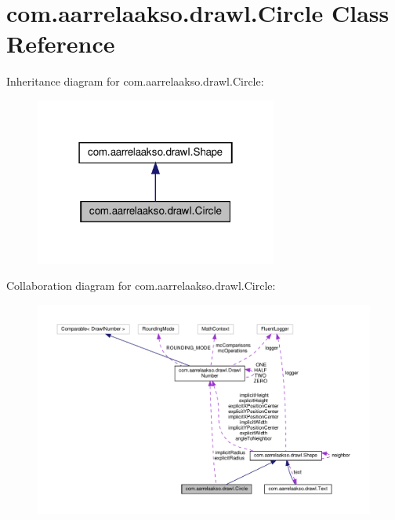 \hypertarget{classcom_1_1aarrelaakso_1_1drawl_1_1_circle}{}\section{com.\+aarrelaakso.\+drawl.\+Circle Class Reference}
\label{classcom_1_1aarrelaakso_1_1drawl_1_1_circle}


Inheritance diagram for com.\+aarrelaakso.\+drawl.\+Circle\+:\nopagebreak
\begin{figure}[H]
\begin{center}
\leavevmode
\includegraphics[width=226pt]{dd/d1c/classcom_1_1aarrelaakso_1_1drawl_1_1_circle__inherit__graph}
\end{center}
\end{figure}


Collaboration diagram for com.\+aarrelaakso.\+drawl.\+Circle\+:
\nopagebreak
\begin{figure}[H]
\begin{center}
\leavevmode
\includegraphics[width=350pt]{de/d25/classcom_1_1aarrelaakso_1_1drawl_1_1_circle__coll__graph}
\end{center}
\end{figure}

